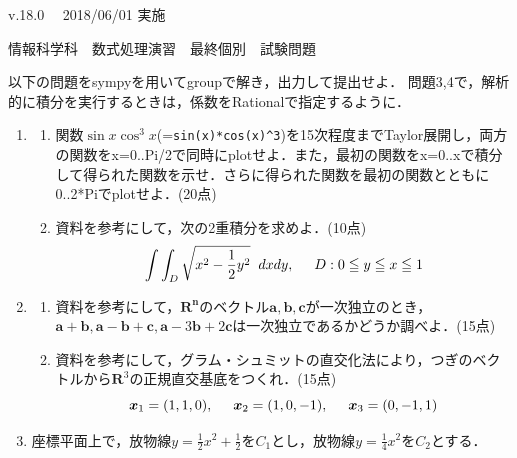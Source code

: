\documentclass[12pt,a4j]{jarticle}
\begin{document}
\small{v.18.0}　
\hfill\small{2018/06/01 実施}
\begin{center}
{\gt\large{情報科学科　数式処理演習　最終個別　試験問題}}
\end{center}
\vspace{5mm}

以下の問題をsympyを用いてgroupで解き，出力して提出せよ．
問題3,4で，解析的に積分を実行するときは，係数をRationalで指定するように．

\begin{enumerate}

\item 
\begin{enumerate}
\item 
関数$\sin x \cos^3 x$(=\verb|sin(x)*cos(x)^3|)を15次程度までTaylor展開し，両方の関数をx=0..Pi/2で同時にplotせよ．また，最初の関数をx=0..xで積分して得られた関数を示せ．さらに得られた関数を最初の関数とともに0..2*Piでplotせよ．(20点)

\item
資料を参考にして，次の2重積分を求めよ．(10点)
\begin{equation*}
\int \int_D \sqrt{x^2-\frac{1}{2}y^2}\hspace{2mm}dxdy,\hspace{5mm} D:0\leqq y \leqq x \leqq 1 
\end{equation*}

\end{enumerate}

\item 
\begin{enumerate}
\item 
資料を参考にして，$\boldsymbol{R^n}$のベクトル$\boldsymbol{a,b,c}$が一次独立のとき，$\boldsymbol{a}+\boldsymbol{b}, \boldsymbol{a}-\boldsymbol{b}+\boldsymbol{c}, \boldsymbol{a}-3\boldsymbol{b}+2\boldsymbol{c}$は一次独立であるかどうか調べよ．(15点)
\item
資料を参考にして，グラム・シュミットの直交化法により，つぎのベクトルから$\boldsymbol{R}^3$の正規直交基底をつくれ．(15点)
\begin{equation*}
\boldsymbol{x}_1 = (1,1,0), \hspace{5mm}
\boldsymbol{x}_2=(1,0,-1), \hspace{5mm}
\boldsymbol{x}_3=(0,-1,1)
\end{equation*}
\end{enumerate}


\item 
座標平面上で，放物線$\displaystyle y=\frac{1}{2}x^2+\frac{1}{2}$を$C_1$とし，放物線$\displaystyle y=\frac{1}{4}x^2$を$C_2$とする．


\end{enumerate}
\end{document}
